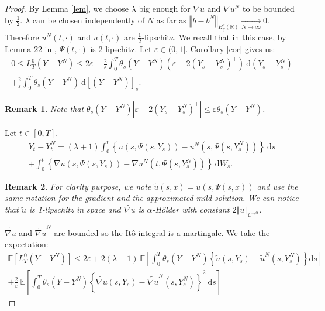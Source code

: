 \documentclass[12pt]{article}
\newtheorem{rem}{Remark}
\newcommand{\norme}[1]{\left\Vert #1\right\Vert}
\newcommand{\R}{\mathbb{R}}
\newcommand{\E}{\mathbb{E}}
\newcommand{\di}{\mathrm{d}}
\begin{document}
\begin{proof}
    By Lemma \ref{lem}, we choose $\lambda$ big enough for $\nabla u$ and $\nabla u^N$ to be bounded by $\frac{1}{2}$. $\lambda$ can be chosen independently of $N$ as far as $\norme{b - b^N}_{H_q^s(\R)} \underset{N\rightarrow\infty}{\longrightarrow} 0$. Therefore $u^N(t,\cdot)$ and $u(t,\cdot)$ are $\frac{1}{2}$-lipschitz. We recall that in this case, by Lemma 22 in \cite{Fla-Iss-Rus-2017}, $\Psi(t,\cdot)$ is 2-lipschitz.
    Let $\varepsilon\in(0,1]$. Corollary \ref{cor} gives us:    
    \begin{multline*}
    0\leq L^0_T(Y-Y^N) \leq 2\varepsilon - \frac{2}{\varepsilon}\int_0^T \theta_s(Y-Y^N) \left(\varepsilon - 2{(Y_s-Y_s^N)^+}\right)\ \di (Y_s-Y_s^N)\\
    +\frac{2}{\varepsilon}\int_0^T \theta_s(Y-Y^N) \ \di[(Y-Y^N)]_s.
    \end{multline*}    
    \begin{rem}
        Note that $\theta_s(Y-Y^N) \left|\varepsilon - 2{(Y_s-Y_s^N)^+}\right|\leq \varepsilon\theta_s(Y-Y^N)$.
    \end{rem}
Let $t\in[0,T]$.
\begin{multline*}
Y_t-Y_t^N = (\lambda + 1 )\int_0^t\left\{u\left(s,\Psi\left(s,Y_s\right)\right)-u^N\left(s,\Psi\left(s,Y_s^N\right)\right)\right\}\ \di s\\ + \int_0^t\left\{\nabla u\left(s,\Psi\left(s,Y_s\right)\right)-\nabla u^N\left(t,\Psi\left(s,Y_s^N\right)\right)\right\}\ \di W_s.
\end{multline*}
\begin{rem}  
    For clarity purpose, we note $\tilde{u}\left(s,x\right) = u\left(s,\Psi\left(s,x\right)\right)$ and use the same notation for the gradient and the approximated mild solution. We can notice that $\tilde{u}$ is 1-lipschitz in space and $\widetilde{\nabla u}$ is $\alpha$-Hölder with constant $2\norme{u}_{\mathcal{C}^{1,\alpha}}$.
\end{rem}
$\widetilde{\nabla u}$ and $\widetilde{\nabla u}^N$ are bounded so the Itô integral is a martingale. We take the expectation:
    \begin{multline*}
    \E\left[L^0_T(Y-Y^N)\right] \leq 2\varepsilon + 2(\lambda + 1)\ \E\left[\int_0^T\theta_s(Y-Y^N)\left\{\tilde{u}\left(s,Y_s\right)-\tilde{u}^N\left(s,Y_s^N\right)\right\} \di s \right]\\
    +\frac{2}{\varepsilon}\ \E\left[\int_0^T \theta_s(Y-Y^N)\left\{\widetilde{\nabla u}\left(s,Y_s\right)-\widetilde{\nabla u}^N\left(s,Y_s^N\right)\right\}^2\ \di s\right]

\end{multline*}
\end{proof}
\end{document}
